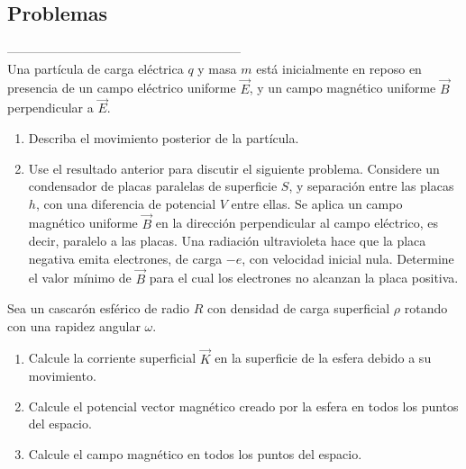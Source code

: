 \subsection{Problemas}
--------------------------------------------------------
\\


\np
Una partícula de carga eléctrica $q$ y masa $m$ está inicialmente en reposo en presencia de un campo eléctrico uniforme $\vec{E}$, y un campo magnético uniforme $\vec{B}$ perpendicular a $\vec{E}$.

\begin{enumerate}[label=\alph*)]
	\item Describa el movimiento posterior de la partícula.

	\item Use el resultado anterior para discutir el siguiente problema. Considere un condensador de placas paralelas de superﬁcie $S$, y separación entre las placas $h$, con una diferencia de potencial $V$ entre ellas. Se aplica un campo magnético uniforme $\vec{B}$ en la dirección perpendicular al campo eléctrico, es decir, paralelo a las placas. Una radiación ultravioleta hace que la placa negativa emita electrones, de carga $-e$, con velocidad inicial nula. Determine el valor mínimo de $\vec{B}$ para el cual los electrones no alcanzan la placa positiva.


\end{enumerate}

\bigbreak

\np
Sea un cascarón esférico de radio $R$ con densidad de carga superficial $\rho$ rotando con una rapidez angular $\omega$.

\begin{enumerate}[label=\alph*)]
	\item Calcule la corriente superficial $\vec{K}$ en la superficie de la esfera debido a su movimiento.

	\item Calcule el potencial vector magnético creado por la esfera en todos los puntos del espacio.

	\item Calcule el campo magnético en todos los puntos del espacio.
\end{enumerate}

\bigbreak

